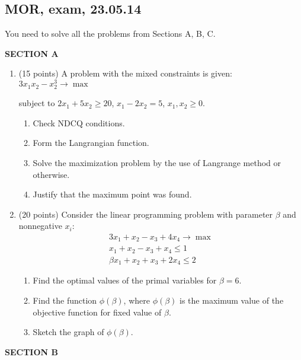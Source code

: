 \subsection{MOR, exam, 23.05.14}

You need to solve all the problems from Sections A, B, C.

\textbf{SECTION A}

\begin{enumerate}
\item (15 points) A problem with the mixed constraints is given: $3x_1 x_2-x_2^3 \to \max$

subject to $2x_1+5x_2 \geq 20$, $x_1-2x_2=5$, $x_1, x_2 \geq 0$.
\begin{enumerate}
\item Check NDCQ conditions.
\item  Form the Langrangian function.
\item Solve the maximization problem by the use of Langrange method or otherwise.
\item Justify that the maximum point was found.
\end{enumerate}
\item  (20 points)   Consider the linear programming problem with parameter $\beta$ and nonnegative $x_i$:
\begin{align*}
3x_1+x_2-x_3+4x_4 \to \max \\
x_1+x_2-x_3+x_4\leq 1 \\
\beta x_1+x_2+x_3+2x_4 \leq 2
\end{align*}

\begin{enumerate}
\item Find the optimal values of the primal variables for $\beta=6$.
\item Find the function $\phi(\beta)$, where $\phi(\beta)$  is the maximum value of the objective function for fixed value of $\beta$.
\item Sketch the graph of $\phi(\beta)$.
\end{enumerate}


\end{enumerate}

\textbf{SECTION B}

